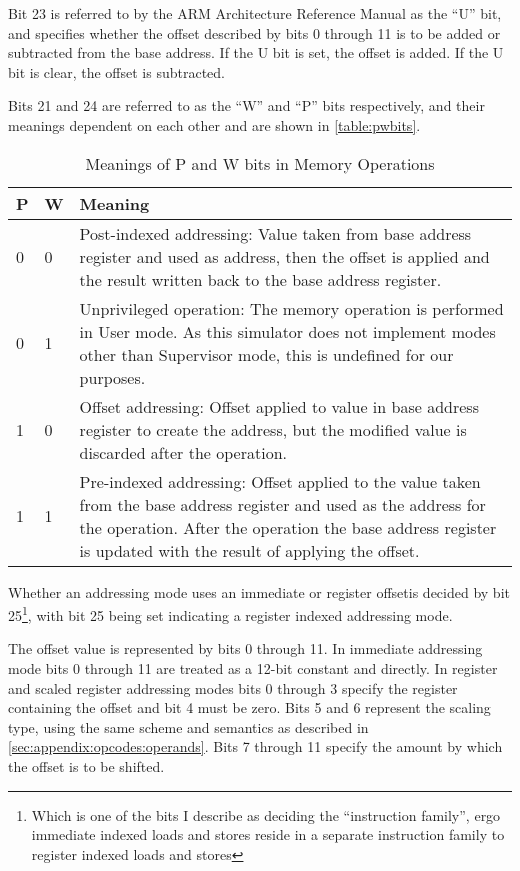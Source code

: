 Bit 23 is referred to by the ARM Architecture Reference Manual as the ``U'' bit, and specifies whether the offset described by bits 0 through 11 is to be added or subtracted from the base address. If the U bit is set, the offset is added. If the U bit is clear, the offset is subtracted.

Bits 21 and 24 are referred to as the ``W'' and ``P'' bits respectively, and their meanings dependent on each other and are shown in \autoref{table:pwbits}.

\begin{table}
  \caption{Meanings of P and W bits in Memory Operations\citep[pp. A5-19]{armarm:2005}}
\label{table:pwbits}
\begin{tabularx}{\textwidth}{l|l|X}
  P & W & Meaning \\ \hline
  0 & 0 & Post-indexed addressing: Value taken from base address register and used as address, then the offset is applied and the result written back to the base address register. \\ \hline
  0 & 1 & Unprivileged operation: The memory operation is performed in User mode. As this simulator does not implement modes other than Supervisor mode, this is undefined for our purposes. \\ \hline
  1 & 0 & Offset addressing: Offset applied to value in base address register to create the address, but the modified value is discarded after the operation. \\ \hline
  1 & 1 & Pre-indexed addressing: Offset applied to the value taken from the base address register and used as the address for the operation. After the operation the base address register is updated with the result of applying the offset.
\end{tabularx}
\end{table}

Whether an addressing mode uses an immediate or register offsetis decided by bit 25\footnote{Which is one of the bits I describe as deciding the ``instruction family'', ergo immediate indexed loads and stores reside in a separate instruction family to register indexed loads and stores}, with bit 25 being set indicating a register indexed addressing mode.

The offset value is represented by bits 0 through 11. In immediate addressing mode bits 0 through 11 are treated as a 12-bit constant and directly. In register and scaled register addressing modes bits 0 through 3 specify the register containing the offset and bit 4 must be zero. Bits 5 and 6 represent the scaling type, using the same scheme and semantics as described in \autoref{sec:appendix:opcodes:operands}. Bits 7 through 11 specify the amount by which the offset is to be shifted.

